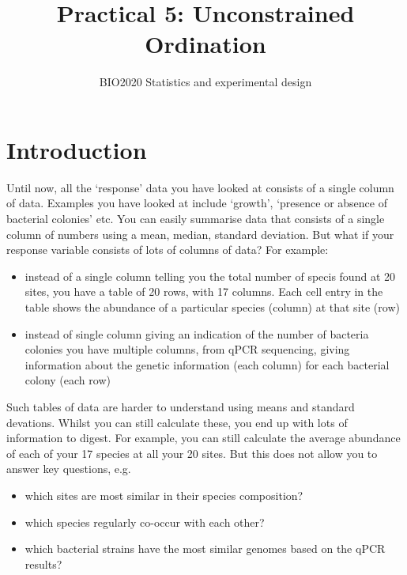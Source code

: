 \documentclass[
]{article}
\title{Practical 5: Unconstrained Ordination}
\subtitle{BIO2020 Statistics and experimental design}
\author{}
\date{\vspace{-2.5em}}
\providecommand{\tightlist}{%
  \setlength{\itemsep}{0pt}\setlength{\parskip}{0pt}}
\begin{document}
\maketitle

\hypertarget{introduction}{%
\section{Introduction}\label{introduction}}

Until now, all the `response' data you have looked at consists of a
single column of data. Examples you have looked at include `growth',
`presence or absence of bacterial colonies' etc. You can easily
summarise data that consists of a single column of numbers using a mean,
median, standard deviation. But what if your response variable consists
of lots of columns of data? For example:

\begin{itemize}
\tightlist
\item
  instead of a single column telling you the total number of specis
  found at 20 sites, you have a table of 20 rows, with 17 columns. Each
  cell entry in the table shows the abundance of a particular species
  (column) at that site (row)
\item
  instead of single column giving an indication of the number of
  bacteria colonies you have multiple columns, from qPCR sequencing,
  giving information about the genetic information (each column) for
  each bacterial colony (each row)
\end{itemize}

Such tables of data are harder to understand using means and standard
devations. Whilst you can still calculate these, you end up with lots of
information to digest. For example, you can still calculate the average
abundance of each of your 17 species at all your 20 sites. But this does
not allow you to answer key questions, e.g.

\begin{itemize}
\tightlist
\item
  which sites are most similar in their species composition?
\item
  which species regularly co-occur with each other?
\item
  which bacterial strains have the most similar genomes based on the
  qPCR results?
\end{itemize}
\end{document}
